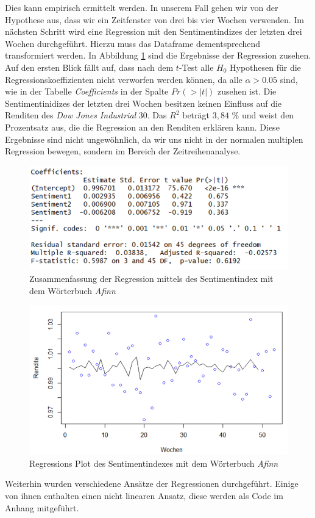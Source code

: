 Dies kann empirisch ermittelt werden. In unserem Fall gehen wir von der Hypothese aus, dass wir ein Zeitfenster von drei bis vier Wochen verwenden. Im nächsten Schritt wird eine Regression mit den Sentimentindizes der letzten drei Wochen durchgeführt. Hierzu muss das Dataframe dementsprechend transformiert werden. In Abbildung \ref{Afinn_summary} sind die Ergebnisse der Regression zusehen. Auf den ersten Blick fällt auf, dass nach dem $t$-Test alle $H_{0}$ Hypothesen für die Regressionskoeffizienten nicht verworfen werden können, da alle $\alpha>0.05$ sind, wie in der Tabelle \textit{Coefficients} in der Spalte $Pr(>|t|)$ zusehen ist. Die Sentimentinidizes der letzten drei Wochen besitzen keinen Einfluss auf die Renditen des \textit{Dow Jones Industrial} $30$. Das $R^2$ beträgt $3,84$ \% und weist den Prozentsatz aus, die die Regression an den Renditen erklären kann. Diese Ergebnisse sind nicht ungewöhnlich, da wir uns nicht in der normalen multiplen Regression bewegen, sondern im Bereich der Zeitreihenanalyse.
 \begin{figure}[H]
	\centering
	\includegraphics[width=1\textwidth]{Pictures/afinn_summary.png}
	\caption{Zusammenfassung der Regression mittels des Sentimentindex mit dem Wörterbuch \textit{Afinn} }
	\label{Afinn_summary}
\end{figure} 
\begin{figure}[H]
	\centering
	\includegraphics[width=1\textwidth]{Pictures/Afinn_plot.png}
	\caption{Regressions Plot des Sentimentindexes mit dem Wörterbuch \textit{Afinn} }
	\label{Afinn_plot_regression}
\end{figure} 
Weiterhin wurden verschiedene Ansätze der Regressionen durchgeführt. Einige von ihnen enthalten einen nicht linearen Ansatz, diese werden als Code im Anhang mitgeführt.  


